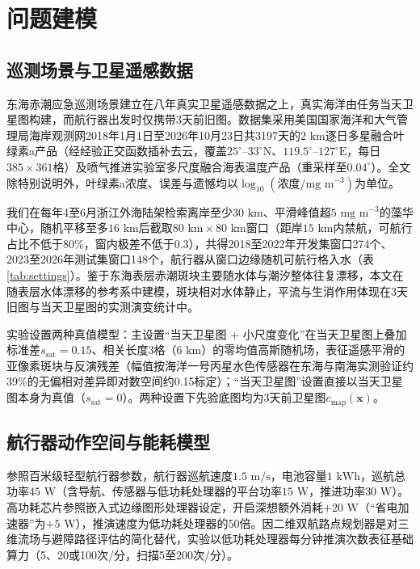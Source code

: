 \section{问题建模}

\subsection{巡测场景与卫星遥感数据}

东海赤潮应急巡测场景建立在八年真实卫星遥感数据之上，真实海洋由任务当天卫星图构建，而航行器出发时仅携带3天前旧图。数据集采用美国国家海洋和大气管理局海岸观测网2018年1月1日至2026年10月23日共3197天的$2\text{ km}$逐日多星融合叶绿素a产品（经经验正交函数插补去云\cite{beckers2003dineof}，覆盖$25^\circ\text{--}33^\circ\text{N}$、$119.5^\circ\text{--}127^\circ\text{E}$，每日$385\times 361$格）及喷气推进实验室多尺度融合海表温度产品（重采样至$0.04^\circ$）\cite{chin2017mur}。全文除特别说明外，叶绿素a浓度、误差与遗憾均以$\log_{10}(\text{浓度}/\text{mg m}^{-3})$为单位。

我们在每年4至6月浙江外海陆架检索离岸至少$30\text{ km}$、平滑峰值超$5\text{ mg m}^{-3}$的藻华中心，随机平移至多$16\text{ km}$后截取$80\text{ km}\times 80\text{ km}$窗口（距岸$15\text{ km}$内禁航，可航行占比不低于80\%，窗内极差不低于0.3），共得2018至2022年开发集窗口274个、2023至2026年测试集窗口148个，航行器从窗口边缘随机可航行格入水（表\ref{tab:settings}）。鉴于东海表层赤潮斑块主要随水体与潮汐整体往复漂移\cite{lou2014diurnal}，本文在随表层水体漂移的参考系中建模，斑块相对水体静止，平流与生消作用体现在3天旧图与当天卫星图的实测演变统计中。

实验设置两种真值模型：主设置“当天卫星图 + 小尺度变化”在当天卫星图上叠加标准差$s_{\text{sat}}=0.15$、相关长度3格（$6\text{ km}$）的零均值高斯随机场，表征遥感平滑的亚像素斑块与反演残差（幅值按海洋一号丙星水色传感器在东海与南海实测验证约39\%的无偏相对差异即对数空间约0.15标定\cite{ye2021cocts}）；“当天卫星图”设置直接以当天卫星图本身为真值（$s_{\text{sat}}=0$）。两种设置下先验底图均为3天前卫星图$c_{\text{map}}(\mathbf{x})$。

\subsection{航行器动作空间与能耗模型}

参照百米级轻型航行器参数\cite{remus100}，航行器巡航速度$1.5\text{ m/s}$，电池容量$1\text{ kWh}$，巡航总功率$45\text{ W}$（含导航、传感器与低功耗处理器的平台功率$15\text{ W}$，推进功率$30\text{ W}$）。高功耗芯片参照嵌入式边缘图形处理器设定\cite{jetsonorinnx}，开启深想额外消耗$+20\text{ W}$（“省电加速器”为$+5\text{ W}$），推演速度为低功耗处理器的50倍。因二维双航路点规划器是对三维流场与避障路径评估的简化替代，实验以低功耗处理器每分钟推演次数表征基础算力（5、20或100次/分，扫描5至200次/分）。

